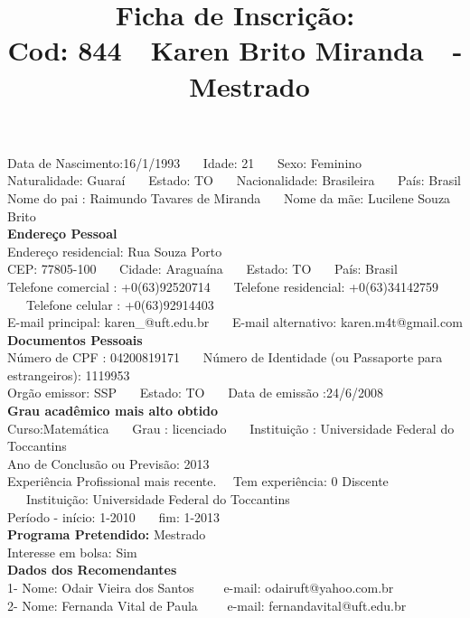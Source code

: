 \documentclass[11pt]{article}
\title{\vspace*{-4cm} Ficha de Inscrição: \\Cod: 844\ \ Karen Brito Miranda\ \ - \ \ Mestrado 
 }
\date{}
\begin{document}
\maketitle
\vspace*{-1.5cm}
\noindent Data de Nascimento:16/1/1993
\ \ \ Idade: 21   \ \ \ Sexo: Feminino
\\
Naturalidade: Guaraí  
\ \ \  Estado: TO
\ \ \  Nacionalidade: Brasileira
\ \ \ País: Brasil
\\        
Nome do pai : Raimundo Tavares de Miranda
\ \ \ Nome da mãe: Lucilene Souza Brito          
\\[0.2cm]                     
\textbf{Endereço Pessoal} 
\\ 
\noindent Endereço residencial: Rua Souza Porto
\\
        CEP: 77805-100 
\ \ \ Cidade: Araguaína 
\ \ \ Estado: TO 
\ \ \ País: Brasil
\\		
		Telefone comercial : +0(63)92520714
\ \ \ Telefone residencial: +0(63)34142759
\ \ \ Telefone celular : +0(63)92914403
\\
E-mail principal: karen\_@uft.edu.br
\ \ \ E-mail alternativo: karen.m4t@gmail.com 
\\[0.2cm] 
\textbf{Documentos Pessoais}
\\
\noindent Número de CPF : 04200819171
\ \ \ Número de Identidade (ou Passaporte para estrangeiros): 1119953
\\
Orgão emissor: SSP
\ \ \ Estado: TO
\ \ \ Data de emissão :24/6/2008
\\[0.3cm]
\textbf{Grau acadêmico mais alto obtido}
\\	
Curso:Matemática
\ \ \ Grau : licenciado
\ \ \ Instituição : Universidade Federal do Toccantins
\\			
Ano de Conclusão ou Previsão: 2013
\\ 
Experiência Profissional mais recente. \ \  
Tem experiência: 0 Discente  
\ \ \ Instituição: Universidade Federal do Toccantins
\\  
Período - início: 1-2010
\ \ \ fim: 1-2013
\\[0.2cm] 
\textbf{Programa Pretendido:} Mestrado\\
Interesse em bolsa: Sim
\\[0.3cm]		
\textbf{Dados dos Recomendantes} 
\\
1- Nome: Odair Vieira dos Santos
\ \ \ \  e-mail: odairuft@yahoo.com.br 
\\
2- Nome: Fernanda Vital de Paula
\ \ \ \ e-mail: fernandavital@uft.edu.br
\\
\end{document}
